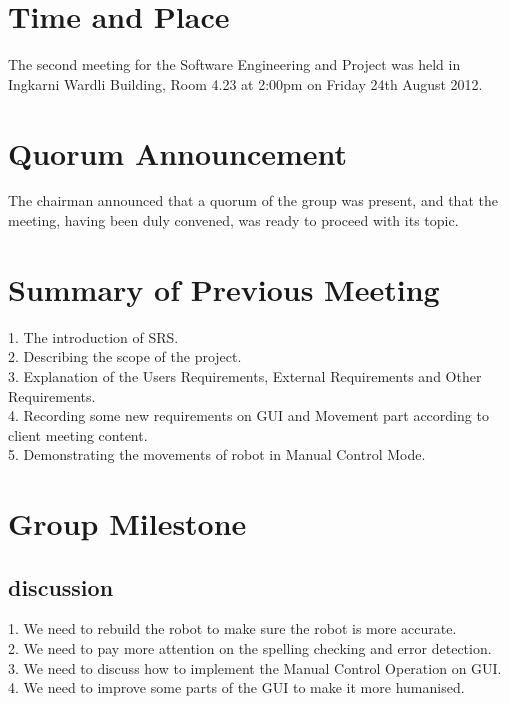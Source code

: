\documentclass[11pt, a4paper]{article}
\begin{document}
\section{Time and Place}
The second meeting for the Software Engineering and Project was held in Ingkarni Wardli Building, Room 4.23 at 2:00pm on Friday 24th August 2012.

\section{Quorum Announcement}
The chairman announced that a quorum of the group was present, and that the meeting, having been duly convened, was ready to proceed with its topic.

\section{Summary of Previous Meeting}
1. The introduction of SRS.\\
2. Describing the scope of the project. \\
3. Explanation of the Users Requirements, External Requirements and Other Requirements.\\
4. Recording some new requirements on GUI and Movement part according to client meeting content.\\
5. Demonstrating the movements of robot in Manual Control Mode.
 

\section{Group Milestone}

\subsection{discussion}
1. We need to rebuild the robot to make sure the robot is more accurate.\\
2. We need to pay more attention on the spelling checking and error detection.\\
3. We need to discuss how to implement the Manual Control Operation on GUI.\\
4. We need to improve some parts of the GUI to make it more humanised.
\end{document}
